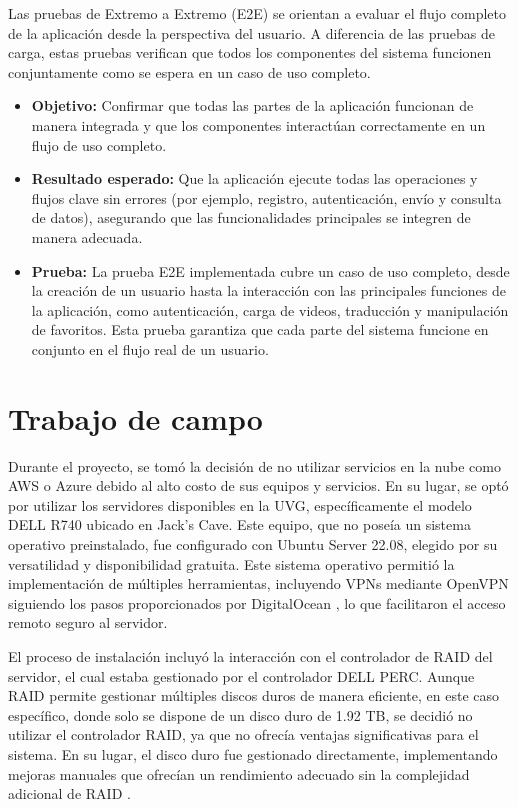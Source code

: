 Las pruebas de Extremo a Extremo (E2E) se orientan a evaluar el flujo completo de la aplicación desde la perspectiva del usuario. A diferencia de las pruebas de carga, estas pruebas verifican que todos los componentes del sistema funcionen conjuntamente como se espera en un caso de uso completo.

\begin{itemize} 
\item \textbf{Objetivo:} Confirmar que todas las partes de la aplicación funcionan de manera integrada y que los componentes interactúan correctamente en un flujo de uso completo. \item \textbf{Resultado esperado:} Que la aplicación ejecute todas las operaciones y flujos clave sin errores (por ejemplo, registro, autenticación, envío y consulta de datos), asegurando que las funcionalidades principales se integren de manera adecuada. 
\item \textbf{Prueba:} La prueba E2E implementada cubre un caso de uso completo, desde la creación de un usuario hasta la interacción con las principales funciones de la aplicación, como autenticación, carga de videos, traducción y manipulación de favoritos. Esta prueba garantiza que cada parte del sistema funcione en conjunto en el flujo real de un usuario. 
\end{itemize}

\section{Trabajo de campo}
Durante el proyecto, se tomó la decisión de no utilizar servicios en la nube como AWS o Azure debido al alto costo de sus equipos y servicios. En su lugar, se optó por utilizar los servidores disponibles en la UVG, específicamente el modelo DELL R740 ubicado en Jack’s Cave. Este equipo, que no poseía un sistema operativo preinstalado, fue configurado con Ubuntu Server 22.08, elegido por su versatilidad y disponibilidad gratuita. Este sistema operativo permitió la implementación de múltiples herramientas, incluyendo VPNs mediante OpenVPN siguiendo los pasos proporcionados por DigitalOcean \cite{digitalocean_openvpn}, lo que facilitaron el acceso remoto seguro al servidor.

El proceso de instalación incluyó la interacción con el controlador de RAID del servidor, el cual estaba gestionado por el controlador DELL PERC. Aunque RAID permite gestionar múltiples discos duros de manera eficiente, en este caso específico, donde solo se dispone de un disco duro de 1.92 TB, se decidió no utilizar el controlador RAID, ya que no ofrecía ventajas significativas para el sistema. En su lugar, el disco duro fue gestionado directamente, implementando mejoras manuales que ofrecían un rendimiento adecuado sin la complejidad adicional de RAID \cite{Raid}.

